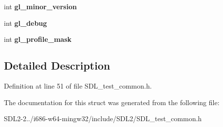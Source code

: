 \begin{DoxyCompactItemize}
\item 
\hypertarget{structSDLTest__CommonState_a5a50c65004454c791da21a3473388608}{int {\bfseries gl\+\_\+minor\+\_\+version}}\label{structSDLTest__CommonState_a5a50c65004454c791da21a3473388608}

\item 
\hypertarget{structSDLTest__CommonState_a2710657ef2a0c8aabebc5fceb01c71b5}{int {\bfseries gl\+\_\+debug}}\label{structSDLTest__CommonState_a2710657ef2a0c8aabebc5fceb01c71b5}

\item 
\hypertarget{structSDLTest__CommonState_aa923ff5f227c35523a4e491863a7d907}{int {\bfseries gl\+\_\+profile\+\_\+mask}}\label{structSDLTest__CommonState_aa923ff5f227c35523a4e491863a7d907}

\end{DoxyCompactItemize}


\subsection{Detailed Description}


Definition at line 51 of file S\+D\+L\+\_\+test\+\_\+common.\+h.



The documentation for this struct was generated from the following file\+:\begin{DoxyCompactItemize}
\item 
S\+D\+L2-\/2../i686-\/w64-\/mingw32/include/\+S\+D\+L2/S\+D\+L\+\_\+test\+\_\+common.\+h\end{DoxyCompactItemize}
